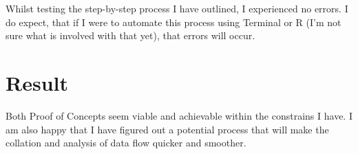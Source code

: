 \documentclass{article}
\begin{document}
Whilst testing the step-by-step process I have outlined, I experienced no errors. I do expect, that if I were to automate this process using Terminal or R (I'm not sure what is involved with that yet), that errors will occur.

\section*{Result}

Both Proof of Concepts seem viable and achievable within the constrains I have. I am also happy that I have figured out a potential process that will make the collation and analysis of data flow quicker and smoother.
\end{document}
